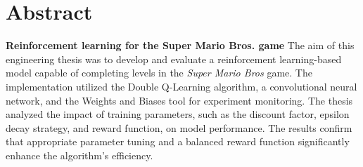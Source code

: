 \chapter*{Abstract}

\noindent\textbf{Reinforcement learning for the Super Mario Bros. game}
The aim of this engineering thesis was to develop and evaluate a reinforcement learning-based model capable of completing levels in the \textit{Super Mario Bros} game. The implementation utilized the Double Q-Learning algorithm, a convolutional neural network, and the Weights and Biases tool for experiment monitoring. The thesis analyzed the impact of training parameters, such as the discount factor, epsilon decay strategy, and reward function, on model performance. The results confirm that appropriate parameter tuning and a balanced reward function significantly enhance the algorithm's efficiency.
